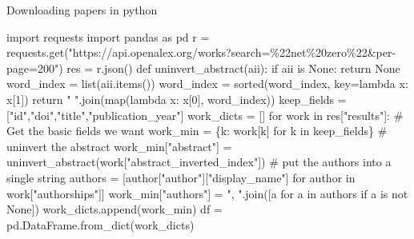 \documentclass[
  10pt,
  ignorenonframetext,
  aspectratio=169]{beamer}
\newenvironment{Shaded}{\begin{snugshade}}{\end{snugshade}}
\newcommand{\BuiltInTok}[1]{\textcolor[rgb]{0.80,0.80,0.80}{#1}}
\newcommand{\CommentTok}[1]{\textcolor[rgb]{0.50,0.62,0.50}{#1}}
\newcommand{\ControlFlowTok}[1]{\textcolor[rgb]{0.94,0.87,0.69}{#1}}
\newcommand{\DecValTok}[1]{\textcolor[rgb]{0.86,0.86,0.80}{#1}}
\newcommand{\ImportTok}[1]{\textcolor[rgb]{0.80,0.80,0.80}{#1}}
\newcommand{\KeywordTok}[1]{\textcolor[rgb]{0.94,0.87,0.69}{#1}}
\newcommand{\NormalTok}[1]{\textcolor[rgb]{0.80,0.80,0.80}{#1}}
\newcommand{\OperatorTok}[1]{\textcolor[rgb]{0.94,0.94,0.82}{#1}}
\newcommand{\StringTok}[1]{\textcolor[rgb]{0.80,0.58,0.58}{#1}}
\newcommand{\VariableTok}[1]{\textcolor[rgb]{0.80,0.80,0.80}{#1}}
\begin{document}
\begin{frame}[fragile]{Downloading papers in python}
\protect\hypertarget{downloading-papers-in-python}{}
\tiny

\begin{Shaded}
\begin{Highlighting}[]
\ImportTok{import}\NormalTok{ requests}
\ImportTok{import}\NormalTok{ pandas }\ImportTok{as}\NormalTok{ pd}
\NormalTok{r }\OperatorTok{=}\NormalTok{ requests.get(}\StringTok{"https://api.openalex.org/works?search=\%22net\%20zero\%22\&per{-}page=200"}\NormalTok{)}
\NormalTok{res }\OperatorTok{=}\NormalTok{ r.json()}
\KeywordTok{def}\NormalTok{ uninvert\_abstract(aii):}
    \ControlFlowTok{if}\NormalTok{ aii }\KeywordTok{is} \VariableTok{None}\NormalTok{:}
        \ControlFlowTok{return} \VariableTok{None}
\NormalTok{    word\_index }\OperatorTok{=} \BuiltInTok{list}\NormalTok{(aii.items())}
\NormalTok{    word\_index }\OperatorTok{=} \BuiltInTok{sorted}\NormalTok{(word\_index, key}\OperatorTok{=}\KeywordTok{lambda}\NormalTok{ x: x[}\DecValTok{1}\NormalTok{])}
    \ControlFlowTok{return} \StringTok{" "}\NormalTok{.join(}\BuiltInTok{map}\NormalTok{(}\KeywordTok{lambda}\NormalTok{ x: x[}\DecValTok{0}\NormalTok{], word\_index))}
\NormalTok{keep\_fields }\OperatorTok{=}\NormalTok{ [}\StringTok{"id"}\NormalTok{,}\StringTok{"doi"}\NormalTok{,}\StringTok{"title"}\NormalTok{,}\StringTok{"publication\_year"}\NormalTok{]}
\NormalTok{work\_dicts }\OperatorTok{=}\NormalTok{ []}
\ControlFlowTok{for}\NormalTok{ work }\KeywordTok{in}\NormalTok{ res[}\StringTok{"results"}\NormalTok{]:}
    \CommentTok{\# Get the basic fields we want}
\NormalTok{    work\_min }\OperatorTok{=}\NormalTok{ \{k: work[k] }\ControlFlowTok{for}\NormalTok{ k }\KeywordTok{in}\NormalTok{ keep\_fields\}}
    \CommentTok{\# uninvert the abstract}
\NormalTok{    work\_min[}\StringTok{"abstract"}\NormalTok{] }\OperatorTok{=}\NormalTok{ uninvert\_abstract(work[}\StringTok{"abstract\_inverted\_index"}\NormalTok{])}
    \CommentTok{\# put the authors into a single string}
\NormalTok{    authors }\OperatorTok{=}\NormalTok{ [author[}\StringTok{"author"}\NormalTok{][}\StringTok{"display\_name"}\NormalTok{] }\ControlFlowTok{for}\NormalTok{ author }\KeywordTok{in}\NormalTok{ work[}\StringTok{"authorships"}\NormalTok{]]}
\NormalTok{    work\_min[}\StringTok{"authors"}\NormalTok{] }\OperatorTok{=} \StringTok{", "}\NormalTok{.join([a }\ControlFlowTok{for}\NormalTok{ a }\KeywordTok{in}\NormalTok{ authors }\ControlFlowTok{if}\NormalTok{ a }\KeywordTok{is} \KeywordTok{not} \VariableTok{None}\NormalTok{])}
\NormalTok{    work\_dicts.append(work\_min)}
\NormalTok{df }\OperatorTok{=}\NormalTok{ pd.DataFrame.from\_dict(work\_dicts)}
\end{Highlighting}
\end{Shaded}
\end{frame}
\end{document}
